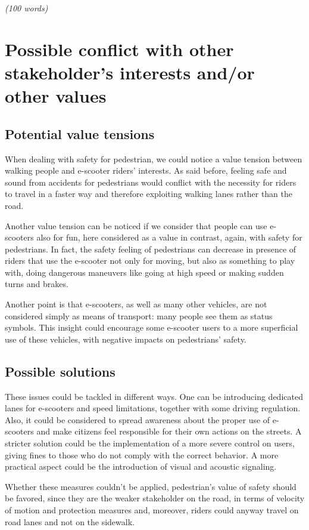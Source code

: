 \emph{(100 words)}

\section{Possible conflict with other stakeholder’s interests and/or other values}
\subsection{Potential value tensions}
When dealing with safety for pedestrian, we could notice a value tension between walking people and e-scooter riders’ interests. As said before, feeling safe and sound from accidents for pedestrians would conflict with the necessity for riders to travel in a faster way and therefore exploiting walking lanes rather than the road. 

Another value tension can be noticed if we consider that people can use e-scooters also for fun, here considered as a value in contrast, again, with safety for pedestrians. In fact, the safety feeling of pedestrians can decrease in presence of riders that use the e-scooter not only for moving, but also as something to play with, doing dangerous maneuvers like going at high speed or making sudden turns and brakes.

Another point is that e-scooters, as well as many other vehicles, are not considered simply as means of transport: many people see them as status symbols. This insight could encourage some e-scooter users to a more superficial use of these vehicles, with negative impacts on pedestrians’ safety.

\newpage
\subsection{Possible solutions}
These issues could be tackled in different ways. One can be introducing dedicated lanes for e-scooters and speed limitations, together with some driving regulation. Also, it could be considered to spread awareness about the proper use of e-scooters and make citizens feel responsible for their own actions on the streets. A stricter solution could be the implementation of a more severe control on users, giving fines to those who do not comply with the correct behavior. A more practical aspect could be the introduction of visual and acoustic signaling.

Whether these measures couldn't be applied, pedestrian’s value of safety should be favored, since they are the weaker stakeholder on the road, in terms of velocity of motion and protection measures and, moreover, riders could anyway travel on road lanes and not on the sidewalk.

